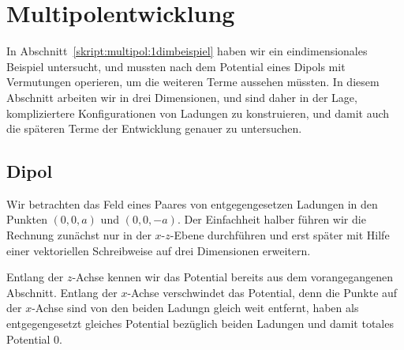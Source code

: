 %
%
%
\section{Multipolentwicklung}
In Abschnitt~\ref{skript:multipol:1dimbeispiel} haben wir ein
eindimensionales Beispiel untersucht, und mussten nach dem Potential
eines Dipols mit Vermutungen operieren, um die weiteren Terme aussehen
müssten.
In diesem Abschnitt arbeiten wir in drei Dimensionen, und sind daher
in der Lage, kompliziertere Konfigurationen von Ladungen zu
konstruieren, und damit auch die späteren Terme der Entwicklung
genauer zu untersuchen.


\subsection{Dipol}
Wir betrachten das Feld eines Paares von entgegengesetzen Ladungen
in den Punkten $(0,0,a)$ und $(0,0,-a)$.
Der Einfachheit halber führen wir die Rechnung zunächst nur
in der $x$-$z$-Ebene durchführen und erst später mit Hilfe einer
vektoriellen Schreibweise auf drei Dimensionen erweitern.

Entlang der $z$-Achse kennen wir das Potential bereits aus
dem vorangegangenen Abschnitt.
Entlang der $x$-Achse verschwindet das Potential, denn die Punkte
auf der $x$-Achse sind von den beiden Ladungn gleich weit entfernt,
haben als entgegengesetzt gleiches Potential bezüglich beiden Ladungen
und damit totales Potential 0.

